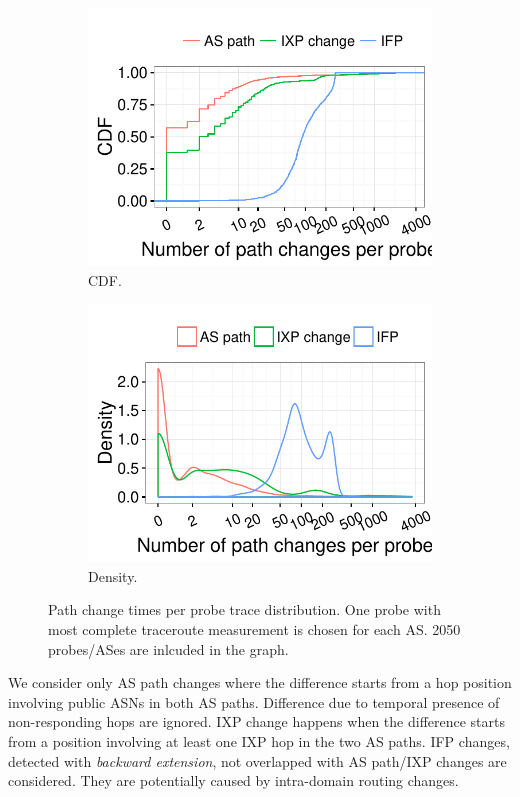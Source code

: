 \begin{figure}[!htb]
    \centering
    \begin{subfigure}[b]{.48\textwidth}
	\centering
	\includegraphics[width=\textwidth]{gfx/chap4/path_ch_count_cdf_cmp.pdf}
	\caption{\footnotesize CDF.}
	\label{fig:path_ch_count_cdf_cmp}
	\end{subfigure}
	\begin{subfigure}[b]{.48\textwidth}
	\centering
	\includegraphics[width=\textwidth]{gfx/chap4/path_ch_count_density_cmp.pdf}
	\caption{\footnotesize Density.}
	\label{fig:path_ch_count_density_cmp}
	\end{subfigure}
\caption{Path change times per probe trace distribution. One probe with most complete traceroute measurement is chosen for each AS. 2050 probes/ASes are inlcuded in the graph.}
\label{fig:path_ch_count_cmp}
\end{figure}
We consider only AS path changes where the difference starts from a hop position involving public ASNs in both AS paths.
Difference due to temporal presence of non-responding hops are ignored.
IXP change happens when the difference starts from a position involving at least one IXP hop in the two AS paths.
IFP changes, detected with \textit{backward extension}, not overlapped with AS path/IXP changes are considered.
They are potentially caused by intra-domain routing changes.

